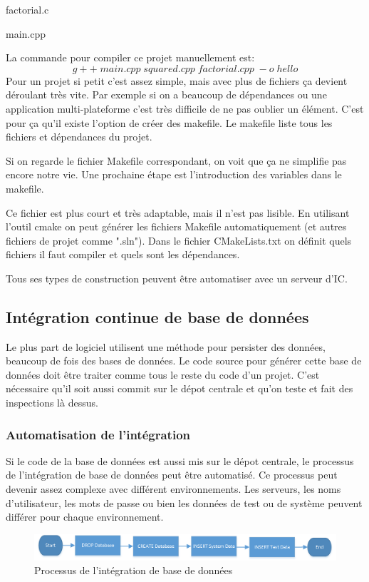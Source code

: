 factorial.c



main.cpp


La commande pour compiler ce projet manuellement est:
$$g++\;main.cpp\;squared.cpp\;factorial.cpp\;-o\;hello$$
Pour un projet si petit c'est assez simple, mais avec plus de fichiers ça devient déroulant très vite.
Par exemple si on a beaucoup de dépendances ou une application multi-plateforme c'est très difficile de ne pas oublier un élément.
\newpage
C'est pour ça qu'il existe l'option de créer des makefile. Le makefile liste tous les fichiers et dépendances du projet.

Si on regarde le fichier Makefile correspondant, on voit que ça ne simplifie pas encore notre vie. Une prochaine étape est l'introduction des variables dans le makefile.


Ce fichier est plus court et très adaptable, mais il n'est pas lisible.
En utilisant l'outil cmake on peut générer les fichiers Makefile automatiquement (et autres fichiers de projet comme ".sln").
Dans le fichier CMakeLists.txt on définit quels fichiers il faut compiler et quels sont les dépendances.


Tous ses types de construction peuvent être automatiser avec un serveur d'IC.
\newpage

\subsection{Intégration continue de base de données}

Le plus part de logiciel utilisent une méthode pour persister des données, beaucoup de fois des bases de données. Le code source pour générer cette base de données doit être traiter comme tous le reste du code d'un projet. C'est nécessaire qu'il soit aussi commit sur le dépot centrale et qu'on teste et fait des inspections là dessus.

\subsubsection{Automatisation de l'intégration}
Si le code de la base de données est aussi mis sur le dépot centrale, le processus de l'intégration de base de données peut être automatisé. Ce processus peut devenir assez complexe avec différent environnements. Les serveurs, les noms d'utilisateur, les mots de passe ou bien les données de test ou de système peuvent différer pour chaque environnement.
\begin{figure}[H]
	\centering
		\includegraphics[scale=1]{bilder/database_integration}
	\caption{Processus de l'intégration de base de données}
	\label{fig:processus}
\end{figure}

